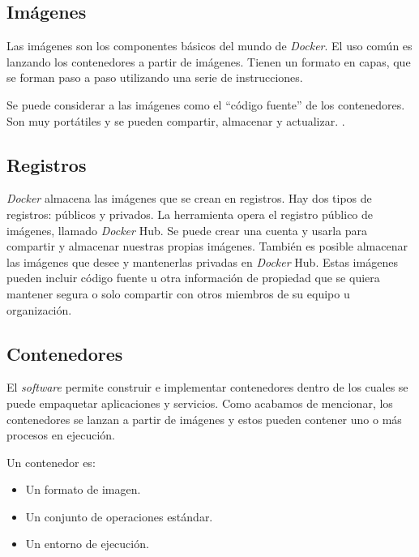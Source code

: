 \subsection{Imágenes}
Las imágenes son los componentes básicos del mundo de \emph{Docker}. El uso común es 
lanzando los contenedores a partir de imágenes. Tienen un formato en capas, que 
se forman paso a paso utilizando una serie de instrucciones.

Se puede considerar a las imágenes como el “código fuente” de los contenedores. 
Son muy portátiles y se pueden compartir, almacenar y actualizar. .

\subsection{Registros}
\emph{Docker} almacena las imágenes que se crean en registros. Hay dos tipos de 
registros: públicos y privados. La herramienta opera el registro público de imágenes, 
llamado \emph{Docker} Hub. Se puede crear una cuenta y usarla para 
compartir y almacenar nuestras propias imágenes. También es posible almacenar 
las imágenes que desee y mantenerlas privadas en \emph{Docker} Hub. Estas imágenes 
pueden incluir código fuente u otra información de propiedad que se quiera 
mantener segura o solo compartir con otros miembros de su equipo u organización.

\subsection{Contenedores}
El \emph{software} permite construir e implementar contenedores dentro de los cuales se puede 
empaquetar aplicaciones y servicios. Como acabamos de mencionar, los contenedores 
se lanzan a partir de imágenes y estos pueden contener uno o más procesos en ejecución.

\noindent Un contenedor es:
\begin{itemize}
    \setlength\itemsep{-0.6em}
    \item Un formato de imagen.
    \item Un conjunto de operaciones estándar.
    \item Un entorno de ejecución.
\end{itemize}

